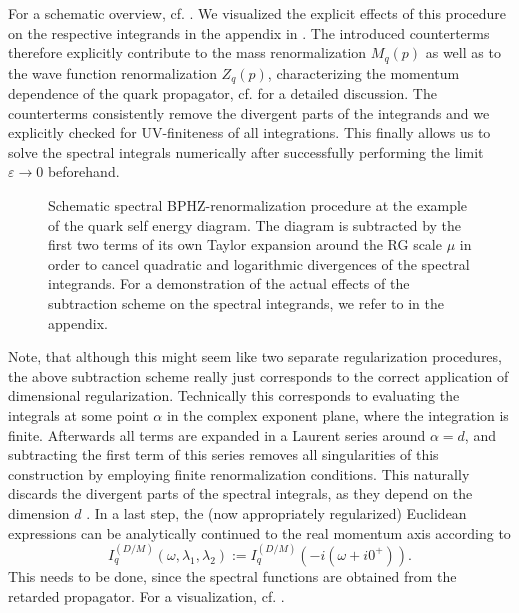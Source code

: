  For a schematic overview, cf. . We visualized the explicit effects of this procedure on the respective integrands in the appendix in .
 The introduced counterterms therefore explicitly contribute to the mass renormalization $M_q(p)$ as well as to the wave function renormalization $Z_q(p)$, characterizing the momentum dependence of the quark propagator, cf.  for a detailed discussion. The counterterms consistently remove the divergent parts of the integrands and we explicitly checked for UV-finiteness of all integrations. This finally allows us to solve the spectral integrals numerically after successfully performing the limit $\varepsilon\rightarrow 0$ beforehand.
 \begin{figure}[t]
	\centering
	
	\caption[Schematic spectral BPHZ-renormalization procedure at the example of the quark self energy diagram.]{Schematic spectral BPHZ-renormalization procedure at the example of the quark self energy diagram. The diagram is subtracted by the first two terms of its own Taylor expansion around the RG scale $\mu$ in order to cancel quadratic and logarithmic divergences of the spectral integrands. For a demonstration of the actual effects of the subtraction scheme on the spectral integrands, we refer to  in the appendix.} 
	\label{fig:BPHZ}
\end{figure}
Note, that although this might seem like two separate regularization procedures, the above subtraction scheme really just corresponds to the correct application of dimensional regularization. Technically this corresponds to evaluating the integrals at some point $\alpha$ in the complex exponent plane, where the integration is finite. Afterwards all terms are expanded in a Laurent series around $\alpha=d$, and subtracting the first term of this series removes all singularities of this construction by employing finite renormalization conditions. This naturally discards the divergent parts of the spectral integrals, as they depend on the dimension $d$ \cite{Leibbrandt1975, Horak2019}.
In a last step, the (now appropriately regularized) Euclidean expressions can be analytically continued to the real momentum axis according to 
\begin{equation}
	I_q^{(D/M)}\left(\omega, \lambda_1, \lambda_2\right) := I_q^{(D/M)}\left(-i(\omega + i0^+)\right).
\end{equation}
This needs to be done, since the spectral functions are obtained from the retarded propagator. For a visualization, cf. .

